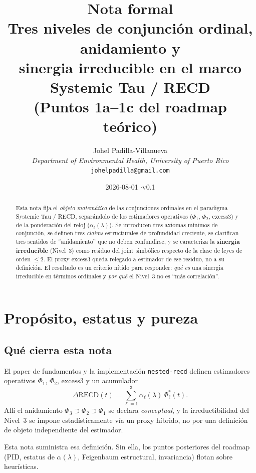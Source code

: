 \documentclass[11pt,a4paper]{article}
\title{\textbf{Nota formal}\\[0.4em]
\large Tres niveles de conjunci\'on ordinal, anidamiento y\\
sinergia irreducible en el marco Systemic Tau / RECD\\[0.6em]
\normalsize (Puntos 1a--1c del roadmap te\'orico)}
\author{
Johel Padilla-Villanueva\\
\textit{Department of Environmental Health, University of Puerto Rico}\\
\texttt{johelpadilla@gmail.com}
}
\date{2026-08-01 \quad$\cdot$\quad v0.1}
\theoremstyle{definition}
\theoremstyle{plain}
\theoremstyle{remark}
\newcommand{\RECD}{\mathrm{RECD}}
\newcommand{\excess}{\mathrm{excess3}}
\begin{document}
\maketitle

\begin{abstract}
Esta nota fija el \emph{objeto matem\'atico} de las conjunciones ordinales
en el paradigma Systemic Tau / RECD, separ\'andolo de los estimadores
operativos ($\Phi_1$, $\Phi_2$, $\excess$) y de la ponderaci\'on del reloj
($\alpha_\ell(\lambda)$). Se introducen tres axiomas m\'inimos de
conjunci\'on, se definen tres \emph{claims} estructurales de profundidad
creciente, se clarifican tres sentidos de ``anidamiento'' que no deben
confundirse, y se caracteriza la \textbf{sinergia irreducible} (Nivel~3)
como residuo del joint simb\'olico respecto de la clase de leyes de orden
$\le 2$. El proxy $\excess$ queda relegado a estimador de ese residuo, no
a su definici\'on. El resultado es un criterio n\'itido para responder:
\emph{qu\'e es} una sinergia irreducible en t\'erminos ordinales y
\emph{por qu\'e} el Nivel~3 no es ``m\'as correlaci\'on''.
\end{abstract}

\tableofcontents
\vspace{1em}

\section{Prop\'osito, estatus y pureza}
\label{sec:purpose}

\subsection{Qu\'e cierra esta nota}

El paper de fundamentos \cite{Padilla2026framework} y la implementaci\'on
\texttt{nested-recd} definen estimadores operativos
$\Phi_1$, $\Phi_2$, $\excess$ y un acumulador
\[
\Delta\RECD(t)=\sum_{\ell=1}^{3}\alpha_\ell(\lambda)\,\Phi_\ell^\ast(t).
\]
All\'i el anidamiento $\Phi_3\supset\Phi_2\supset\Phi_1$ se declara
\emph{conceptual}, y la irreductibilidad del Nivel~3 se impone
estad\'isticamente v\'ia un proxy h\'ibrido, no por una definici\'on de
objeto independiente del estimador.

Esta nota suministra esa definici\'on. Sin ella, los puntos posteriores del
roadmap (PID, estatus de $\alpha(\lambda)$, Feigenbaum estructural,
invariancia) flotan sobre heur\'isticas.
\end{document}
